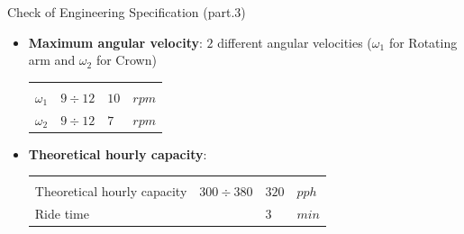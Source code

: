 \documentclass{beamer}              %
\begin{document}
	\begin{frame}{Check of Engineering Specification (part.3)}
		\small
		\begin{itemize}
			\item \textbf{Maximum angular velocity}: $2$ different angular velocities ($\omega_{1}$ for Rotating arm and $\omega_{2}$ for Crown)
			\begin{center}
				\begin{tabular}{p{4 cm} p{2 cm} p{1.5 cm} p{0.5 cm}}
					\textbf{} &\textbf{} &\textbf{} & \\						
					\centering $\omega_1$ & $9\div12$ & $10$ & $rpm$ \\ \centering $\omega_2$ & $9\div12$ & $7$ & $rpm$ \\
					\midrule
				\end{tabular}
			\end{center}
			
			\medskip
			
			\item \textbf{Theoretical hourly capacity}: 
			\begin{center}
				\begin{tabular}{p{4 cm} p{2 cm} p{1.5 cm} p{0.5 cm}}
					\textbf{} &\textbf{} &\textbf{} & \\						
					\centering Theoretical hourly capacity & $300 \div 380$ & $320$ & $pph$ \\ \centering Ride time & & $3$ & $min$ \\
					\midrule
				\end{tabular}
			\end{center}		
		\end{itemize}
	\end{frame}
\end{document}
